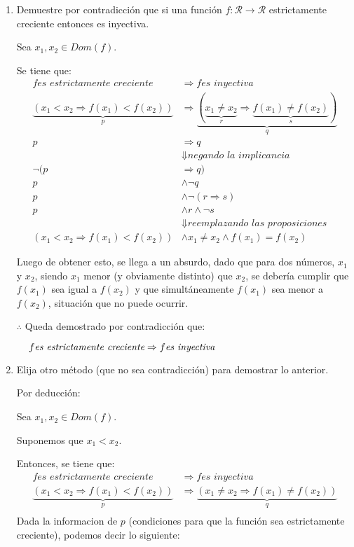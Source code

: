 \documentclass[spanish, fleqn]{article}
\begin{document}
\begin{enumerate}
\item Demuestre por contradicción que si una función \(f: \mathcal{R} \rightarrow \mathcal{R}\) estrictamente creciente entonces es inyectiva.

Sea $x_1,x_2\in Dom(f)$.

Se tiene que:
\begin{align*}
f \textit{es estrictamente creciente} &\Rightarrow f \textit{es inyectiva}\\
\underbrace{(x_1 < x_2 \Rightarrow f(x_1)< f(x_2))}_{p}&\Rightarrow  \underbrace{(\underbrace{x_1\neq x_2}_{r} \Rightarrow \underbrace{f(x_1)\neq f(x_2)}_{s})}_{q}\\
p &\Rightarrow q\\
&\Downarrow \textit{negando la implicancia}\\
\neg (p&\Rightarrow q)\\
p &\wedge \neg q \\
p &\wedge \neg (r \Rightarrow s)\\
p &\wedge r \wedge \neg s\\
&\Downarrow \textit{reemplazando las proposiciones}\\
(x_1 < x_2 \Rightarrow f(x_1)< f(x_2))&\wedge x_1\neq x_2 \wedge f(x_1)= f(x_2)
\end{align*}

Luego de obtener esto, se llega a un absurdo, dado que para dos números, $x_1$ y $x_2$, siendo $x_1$ menor (y obviamente distinto) que $x_2$, se debería cumplir que $f(x_1)$ sea igual a $f(x_2)$ y que simultáneamente $f(x_1)$ sea menor a $f(x_2)$, situación que no puede ocurrir.

$\therefore$ Queda demostrado por contradicción que:

$\hspace{0.4cm} f \textit{es estrictamente creciente} \Rightarrow f \textit{es inyectiva}$
 
\item Elija otro método  (que no sea contradicción) para demostrar lo anterior.

Por deducción:

Sea $x_1,x_2\in Dom(f)$.

Suponemos que $x_1<x_2$.

Entonces, se tiene que:
\begin{align*}
f \textit{es estrictamente creciente} &\Rightarrow f \textit{es inyectiva}\\
\underbrace{(x_1 < x_2 \Rightarrow f(x_1)< f(x_2))}_{p}&\Rightarrow \underbrace{(x_1\neq x_2\Rightarrow f(x_1)\neq f(x_2))}_{q}\\
\end{align*}
Dada la informacion de $p$ (condiciones para que la función sea estrictamente creciente), podemos decir lo siguiente:


\end{enumerate}
\end{document}
